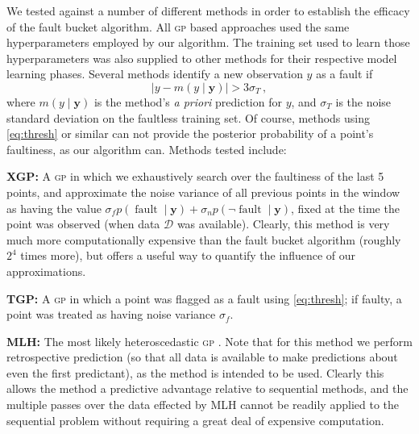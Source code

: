 \documentclass{article} %
\newcommand{\given}{\!\ensuremath{\mid}\!}
\newcommand{\cm}[1]{\ensuremath{\mathcal{#1}}}
\newcommand{\bm}[1]{\ensuremath{\mathbf{#1}}}
\newcommand{\data}{\ensuremath{\cm{D}}}
\newcommand{\acro}[1]{\textsc{#1}}
\newcommand{\vect}[1]{\bm{#1}}
\newcommand{\vy}{\vect{y}}
\newcommand{\p}[2]{p(#1\given#2)}
\newcommand{\mean}[2]{{m}(#1\given#2)}
\DeclareMathOperator{\fault}{fault}
\begin{document}
We tested against a number of different methods in order to establish the efficacy of the fault bucket algorithm. All \acro{gp} based approaches used the same hyperparameters employed by our algorithm. The training set used to learn those hyperparameters was also supplied to other methods for their respective model learning phases. Several methods identify a new observation $y$ as a fault if
\begin{equation}\label{eq:thresh}
 |y-\mean{y}{\vy}|>3\sigma_T\,,
\end{equation}
where $\mean{y}{\vy}$ is the method's \emph{a priori} prediction for $y$, and $\sigma_T$ is the noise standard deviation on the faultless training set. Of course, methods using \eqref{eq:thresh} or similar can not provide the posterior probability of a point's faultiness, as our algorithm can. Methods tested include:

{\bf XGP:}
A  \acro{gp} in which we exhaustively search over the faultiness of the last 5 points, and approximate the noise variance of all previous points in the window as having the value $\sigma_f \p{\fault}{\vy} + \sigma_n \p{\neg\fault}{\vy}$, fixed at the time the point was observed (when data $\data$ was available). Clearly, this method is very much more computationally expensive than the fault bucket algorithm (roughly $2^4$ times more), but offers a useful way to quantify the influence of our approximations.

{\bf TGP:}
A \acro{gp} in which a point was flagged as a fault using \eqref{eq:thresh}; if faulty, a point was treated as having noise variance $\sigma_f$.


{\bf MLH:} 
The most likely heteroscedastic  \acro{gp} \citep{kersting2007most}. Note that for this method we perform retrospective prediction (so that all data is available to make predictions about even the first predictant), as the method is intended to be used. Clearly this allows the method a predictive advantage relative to sequential methods, and the multiple passes over the data effected by \acro{MLH} cannot be readily applied to the sequential problem without requiring a great deal of expensive computation. 
\end{document}
